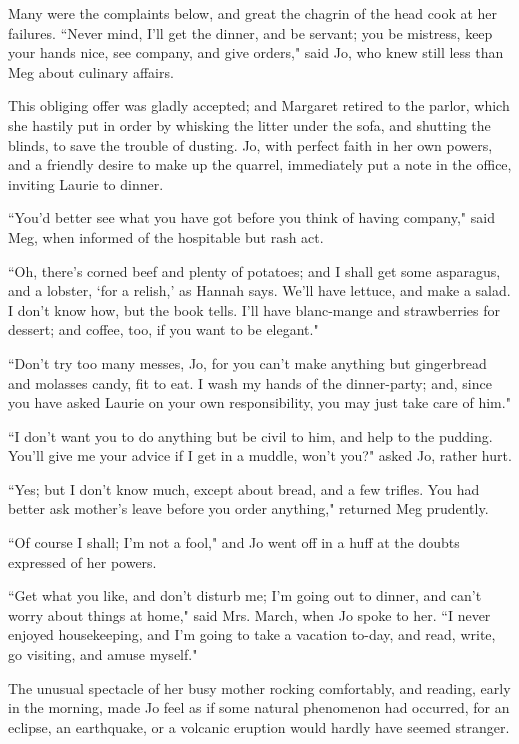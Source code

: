 Many were the complaints below, and great the chagrin of the head cook
at her failures. ``Never mind, I'll get the dinner, and
be servant; you be mistress, keep your hands nice, see company, and give
orders," said Jo, who knew still less than Meg about culinary affairs.

This obliging offer was gladly accepted; and Margaret retired to the
parlor, which she hastily put in order by whisking the litter under the
sofa, and shutting the blinds, to save the trouble of dusting. Jo, with
perfect faith in her own powers, and a friendly desire to make up the
quarrel, immediately put a note in the office, inviting Laurie to
dinner.

``You'd better see what you have got before you think of
having company," said Meg, when informed of the hospitable but rash act.

``Oh, there's corned beef and plenty of potatoes; and I
shall get some asparagus, and a lobster, `for a
relish,' as Hannah says. We'll have
lettuce, and make a salad. I don't know how, but the
book tells. I'll have blanc-mange and strawberries for
dessert; and coffee, too, if you want to be elegant."

``Don't try too many messes, Jo, for you
can't make anything but gingerbread and molasses candy,
fit to eat. I wash my hands of the dinner-party; and, since you have
asked Laurie on your own responsibility, you may just take care of him."

``I don't want you to do anything but be civil to him,
and help to the pudding. You'll give me your advice if I
get in a muddle, won't you?" asked Jo, rather hurt.

``Yes; but I don't know much, except about bread, and a
few trifles. You had better ask mother's leave before
you order anything," returned Meg prudently.

``Of course I shall; I'm not a fool," and Jo went off in
a huff at the doubts expressed of her powers.

``Get what you like, and don't disturb me;
I'm going out to dinner, and can't worry
about things at home," said Mrs. March, when Jo spoke to her. ``I never
enjoyed housekeeping, and I'm going to take a vacation
to-day, and read, write, go visiting, and amuse myself."

The unusual spectacle of her busy mother rocking comfortably, and
reading, early in the morning, made Jo feel as if some natural
phenomenon had occurred, for an eclipse, an earthquake, or a volcanic
eruption would hardly have seemed stranger.

